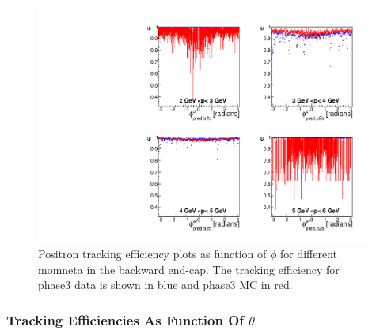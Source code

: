 \documentclass[a4paper,11pt,twosided,final,german,openbib,pdftex,listof=totoc,bibliography=totoc]{scrbook}
\begin{document}
\begin{figure}[!htbp]
	\centering
	\includegraphics[width=\textwidth]{Plots/master3/xPMPhiepECP3}
	\caption[Momentum $\phi$ Positron Backward End-Cap Efficiency Phase3]{Positron tracking efficiency plots as function of $\phi$ for different momneta in the backward end-cap. The tracking efficiency for phase3 data is shown in blue and phase3 MC in red.}
	
	\label{plt:xPMPhiepEC3}
\end{figure}

\newpage

\subsubsection{Tracking Efficiencies As Function Of $\theta$}
\end{document}
